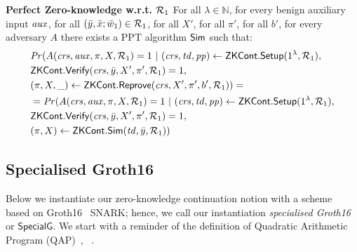 \begin{definition}[ZK Continuations]
\noindent \textbf{Perfect Zero-knowledge w.r.t. $\mathcal{R}_1$} For all $\lambda \in \mathbb{N}$, for every benign auxiliary input $\mathit{aux}$, 
for all  $(\bar{y}, \bar{x}; \bar{w}_1) \in \mathcal{R}_1$, for all $X'$, for all $\pi'$, for all $b'$, for every adversary $A$ there exists a PPT algorithm $ {\mathsf{Sim}} $ such that:
\begin{align*}
& \mathit{Pr} (A(\mathit{crs}, \mathit{aux}, \pi, X, \mathcal{R}_1) = 1 \ | \ (\mathit{crs}, \mathit{td}, \mathit{pp}) \leftarrow {\ensuremath{\mathsf{ZKCont}}}.{\mathsf{Setup}} (1^{\lambda}, \mathcal{R}_1), \\
                  & {\mathsf{ZKCont}}.{\mathsf{Verify}}(\mathit{crs}, \bar{y}, X', \pi', \mathcal{R}_1) = 1, \\
                  & (\pi, X, \_) \leftarrow {\ensuremath{\mathsf{ZKCont}}}.{\mathsf{Reprove}} (\mathit{crs}, X', \pi', b', \mathcal{R}_1)) =  \\
& = \mathit{Pr}(A(\mathit{crs}, \mathit{aux}, \pi, X, \mathcal{R}_1) = 1 \ | \ (\mathit{crs}, \mathit{td}, \mathit{pp}) \leftarrow {\ensuremath{\mathsf{ZKCont}}}.{\mathsf{Setup}} (1^{\lambda}, \mathcal{R}_1), \\ 
                     & {\mathsf{ZKCont}}.{\mathsf{Verify}}(\mathit{crs}, \bar{y}, X', \pi', \mathcal{R}_1) = 1, \\ 
                     & (\pi, X) \leftarrow {\ensuremath{\mathsf{ZKCont}}}.{\mathsf{Sim}}(\mathit{td}, \bar{y}, \mathcal{R}_1))
\end{align*} 
\end{definition} 


\subsection{Specialised Groth16}
\label{sec:rvrf_groth16}

Below we instantiate our zero-knowledge continuation notion with a scheme based on Groth16~\cite{Groth16} SNARK;
hence, we call our instantiation \emph{specialised Groth16} or \emph{$\mathsf{SpecialG}$}. We start with a  
reminder of the definition of Quadratic Arithmetic Program (QAP)~\cite{LegoSNARK}, ~\cite{GGPR13}.

